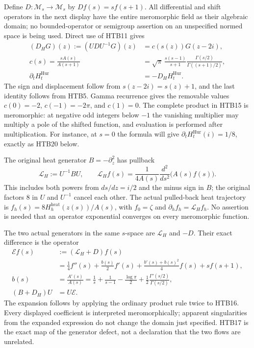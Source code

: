 \documentclass[11pt]{article}
\theoremstyle{definition}
\begin{document}
Define $D:\mathcal M_s\to\mathcal M_s$ by $Df(s)=s f(s+1)$.
All differential and shift operators in the next display have the
entire meromorphic field as their algebraic domain; no bounded-operator
or semigroup assertion on an unspecified normed space is being used.
Direct use of HTB11 gives
\begin{equation}\tag{HTB15}
\begin{split}
 (D_H G)(z):=(UDU^{-1}G)(z)
 &=c(s(z))G(z-2i),\\
 c(s)=\frac{sA(s)}{A(s+1)}
 &=\sqrt{\pi}\,\frac{s(s-1)}{s+1}
       \frac{\Gamma(s/2)}{\Gamma((s+1)/2)},\\
 \partial_tH_t^{\mathrm{Hur}}&=-D_HH_t^{\mathrm{Hur}}.
\end{split}
\end{equation}
The sign and displacement follow from $s(z-2i)=s(z)+1$, and the last
identity follows from HTB5. Gamma recurrence gives the removable values
$c(0)=-2$, $c(-1)=-2\pi$, and $c(1)=0$. The complete product in HTB15
is meromorphic: at negative odd integers below $-1$ the vanishing
multiplier may multiply a pole of the shifted function, and evaluation
is performed after multiplication. For instance, at $s=0$ the formula
will give $\partial_tH_t^{\mathrm{Hur}}(i)=1/8$, exactly as HTB20 below.

The original heat generator $B=-\partial_z^2$ has pullback
\begin{equation}\tag{HTB16}
 \mathcal L_H:=U^{-1}BU,\qquad
 \mathcal L_H f(s)=\frac1{4A(s)}\frac{d^2}{ds^2}\bigl(A(s)f(s)\bigr).
\end{equation}
This includes both powers from $ds/dz=i/2$ and the minus sign in $B$;
the original factors $8$ in $U$ and $U^{-1}$ cancel each other.
The actual pulled-back heat trajectory is
$f_h(s)=8H_h^{\mathrm{heat}}(z(s))/A(s)$, with $f_0=\zeta$ and
$\partial_hf_h=\mathcal L_H f_h$. No assertion is needed that an
operator exponential converges on every meromorphic function.

The two actual generators in the same $s$-space are $\mathcal L_H$ and
$-D$. Their exact difference is the operator
\begin{equation}\tag{HTB17}
\begin{split}
 \mathcal E f(s)
 &:=(\mathcal L_H+D)f(s)\\
 &=\frac14 f''(s)+\frac{b(s)}2f'(s)
   +\frac{b'(s)+b(s)^2}{4}f(s)+s f(s+1),\\
 b(s)&=\frac{A'(s)}{A(s)}
 =\frac1s+\frac1{s-1}-\frac{\log\pi}{2}
       +\frac12\frac{\Gamma'(s/2)}{\Gamma(s/2)},\\
 (B+D_H)U&=U\mathcal E.
\end{split}
\end{equation}
The expansion follows by applying the ordinary product rule twice to
HTB16. Every displayed coefficient is interpreted meromorphically;
apparent singularities from the expanded expression do not change the
domain just specified. HTB17 is the exact map of the generator defect,
not a declaration that the two flows are unrelated.
\end{document}
